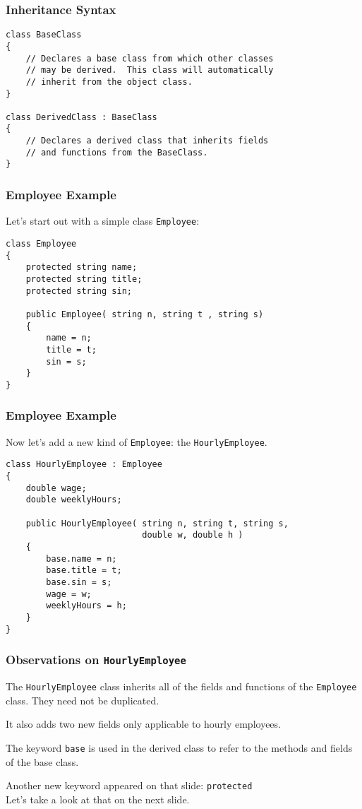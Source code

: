 \begin{frame}[fragile]
\frametitle{Inheritance Syntax}

\begin{verbatim}
class BaseClass
{
    // Declares a base class from which other classes 
    // may be derived.  This class will automatically
    // inherit from the object class.
}

class DerivedClass : BaseClass
{
    // Declares a derived class that inherits fields 
    // and functions from the BaseClass.
}

\end{verbatim}

\end{frame}

\begin{frame}[fragile]
\frametitle{Employee Example}

Let's start out with a simple class \texttt{Employee}:

\begin{verbatim}
class Employee
{
    protected string name;
    protected string title;
    protected string sin;

    public Employee( string n, string t , string s)
    {
        name = n;
        title = t;
        sin = s;
    }
}
\end{verbatim}

\end{frame}


\begin{frame}[fragile]
\frametitle{Employee Example}

Now let's add a new kind of \texttt{Employee}: the \texttt{HourlyEmployee}.

\begin{verbatim}
class HourlyEmployee : Employee
{
    double wage;
    double weeklyHours;

    public HourlyEmployee( string n, string t, string s,
                           double w, double h )
    {
        base.name = n;
        base.title = t;
        base.sin = s;
        wage = w;
        weeklyHours = h;
    }
}
\end{verbatim}

\end{frame}

\begin{frame}
\frametitle{Observations on \texttt{HourlyEmployee}}

The \texttt{HourlyEmployee} class inherits all of the fields and functions of the \texttt{Employee} class. They need not be duplicated.

It also adds two new fields only applicable to hourly employees.

The keyword \texttt{base} is used in the derived class to refer to the methods and fields of the base class.

Another new keyword appeared on that slide: \texttt{protected}\\
\quad Let's take a look at that on the next slide.

\end{frame}


